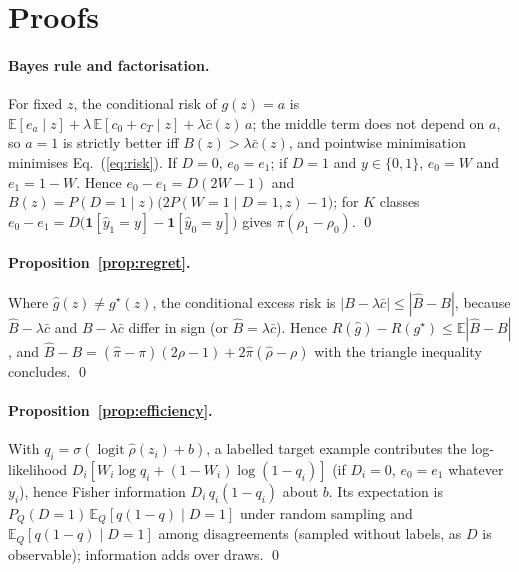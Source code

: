 \section{Proofs}
\label{app:proofs}

\paragraph{Bayes rule and factorisation.}
For fixed $z$, the conditional risk of $g(z)=a$ is $\mathbb E[e_a\mid z]+\lambda\,\mathbb E[c_0+c_T\mid z]+\lambda\bar c(z)\,a$; the middle term does not depend on $a$, so $a=1$ is strictly better iff $B(z)>\lambda\bar c(z)$, and pointwise minimisation minimises Eq.~(\ref{eq:risk}). If $D=0$, $e_0=e_1$; if $D=1$ and $y\in\{0,1\}$, $e_0=W$ and $e_1=1-W$. Hence $e_0-e_1=D(2W-1)$ and $B(z)=P(D{=}1\mid z)\big(2P(W{=}1\mid D{=}1,z)-1\big)$; for $K$ classes $e_0-e_1=D\big(\mathbf 1[\hat y_1{=}y]-\mathbf 1[\hat y_0{=}y]\big)$ gives $\pi(\rho_1-\rho_0)$. \qed

\paragraph{Proposition~\ref{prop:regret}.}
Where $\hat g(z)\neq g^\star(z)$, the conditional excess risk is $|B-\lambda\bar c|\le|\hat B-B|$, because $\hat B-\lambda\bar c$ and $B-\lambda\bar c$ differ in sign (or $\hat B=\lambda\bar c$). Hence $R(\hat g)-R(g^\star)\le\mathbb E|\hat B-B|$, and $\hat B-B=(\hat\pi-\pi)(2\rho-1)+2\hat\pi(\hat\rho-\rho)$ with the triangle inequality concludes. \qed

\paragraph{Proposition~\ref{prop:efficiency}.}
With $q_i=\sigma(\operatorname{logit}\hat\rho(z_i)+b)$, a labelled target example contributes the log-likelihood $D_i[W_i\log q_i+(1-W_i)\log(1-q_i)]$ (if $D_i=0$, $e_0=e_1$ whatever $y_i$), hence Fisher information $D_i\,q_i(1-q_i)$ about $b$. Its expectation is $P_Q(D{=}1)\,\mathbb E_Q[q(1-q)\mid D{=}1]$ under random sampling and $\mathbb E_Q[q(1-q)\mid D{=}1]$ among disagreements (sampled without labels, as $D$ is observable); information adds over draws. \qed

